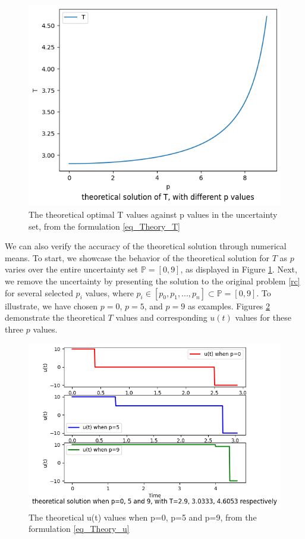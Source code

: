 \documentclass  [
  paper    = a4,
  BCOR     = 10mm,
  twoside,
  fontsize = 12pt,
  fleqn,
  toc      = bibnumbered,
  toc      = listofnumbered,
  numbers  = noendperiod,
  headings = normal,
  listof   = leveldown,
  version  = 3.03
]                                       {scrreprt}
\newcommand{\<}{\langle}
\renewcommand{\>}{\rangle}
\begin{document}
\begin{figure}[h]
	\centerline{\includegraphics[width=12cm]{theory_T_diff_p.png}}
	\caption{The theoretical optimal T values against p values in the uncertainty set, from the formulation \ref{eq_Theory_T}}
	\label{theory_T_diff_p}
\end{figure}

We can also verify the accuracy of the theoretical solution through numerical means. To start, we showcase the behavior of the theoretical solution for $T$ as $p$ varies over the entire uncertainty set $\mathbb{P}=[0,9]$, as displayed in Figure \ref{theory_T_diff_p}. Next, we remove the uncertainty by presenting the solution to the original problem \ref{rc} for several selected $p_i$ values, where $p_i \in [p_0, p_1, ..., p_n] \subset \mathbb{P} = [0,9]$. To illustrate, we have chosen $p=0$, $p=5$, and $p=9$ as examples. Figures \ref{theory_ut_3p} demonstrate the theoretical $T$ values and corresponding $u(t)$ values for these three $p$ values.


\begin{figure}[h]
	\centerline{\includegraphics[width=12cm]{theory_ut_3p.png}}
	\caption{The theoretical u(t) values when p=0, p=5 and p=9, from the formulation \ref{eq_Theory_u}}
	\label{theory_ut_3p}
\end{figure}
\end{document}
